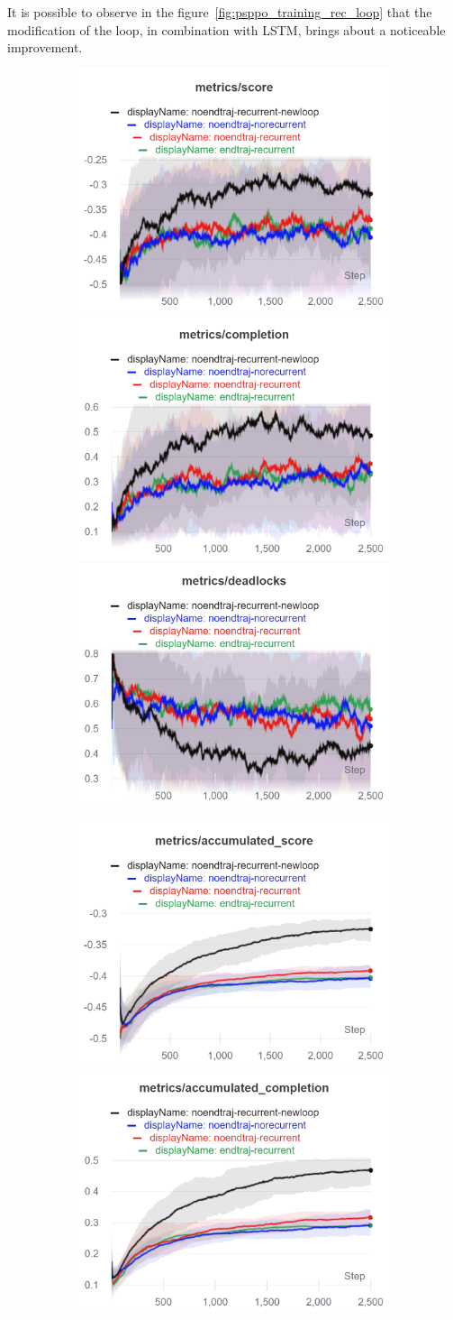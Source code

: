 \documentclass[11pt, a4paper, hidelinks]{report}
\begin{document}
It is possible to observe in the figure~\ref{fig:psppo_training_rec_loop} that the modification of the loop, in combination with LSTM, brings about a noticeable improvement.
\begin{figure}
	\begin{subfigure}{\linewidth}
		\includegraphics[width=0.33\linewidth]{resources/charts_psppo_2/score}\hfill
		\includegraphics[width=0.33\linewidth]{resources/charts_psppo_2/completion}\hfill
		\includegraphics[width=0.33\linewidth]{resources/charts_psppo_2/deadlocks}
	\end{subfigure}\par\medskip
	\begin{subfigure}{\linewidth}
		\includegraphics[width=0.33\linewidth]{resources/charts_psppo_2/accumulated_score}\hfill
		\includegraphics[width=0.33\linewidth]{resources/charts_psppo_2/accumulated_completion}\hfill

\end{subfigure}
\end{figure}
\end{document}
